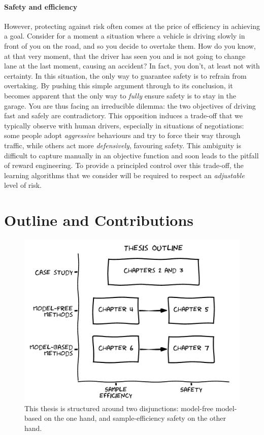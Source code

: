 \paragraph{Safety and efficiency}
However, protecting against risk often comes at the price of efficiency in achieving a goal.
Consider for a moment a situation where a vehicle is driving slowly in front of you on the road, and so you decide to overtake them. How do you know, at that very moment, that the driver has seen you and is not going to change lane at the last moment, causing an accident? In fact, you don't, at least not with certainty. In this situation, the only way to guarantee safety is to refrain from overtaking. By pushing this simple argument through to its conclusion, it becomes apparent that the only way to \emph{fully} ensure safety is to stay in the garage.
You are thus facing an irreducible dilemma: the two objectives of driving fast and safely are contradictory.
This opposition induces a trade-off that we typically observe with human drivers, especially in situations of negotiations: some people adopt \emph{aggressive} behaviours and try to force their way through traffic, while others act more \emph{defensively}, favouring safety. This ambiguity is difficult to capture manually in an objective function and soon leads to the pitfall of reward engineering. To provide a principled control over this trade-off, the learning algorithms that we consider will be required to respect an \emph{adjustable} level of risk.

\section{Outline and Contributions}

\begin{figure}[ht]
	\includegraphics[width=0.9\linewidth]{img/outline}
	\caption{This thesis is structured around two disjunctions: model-free \vs model-based on the one hand, and sample-efficiency \vs safety on the other hand.}
	\label{fig:thesis-outline}
\end{figure}

